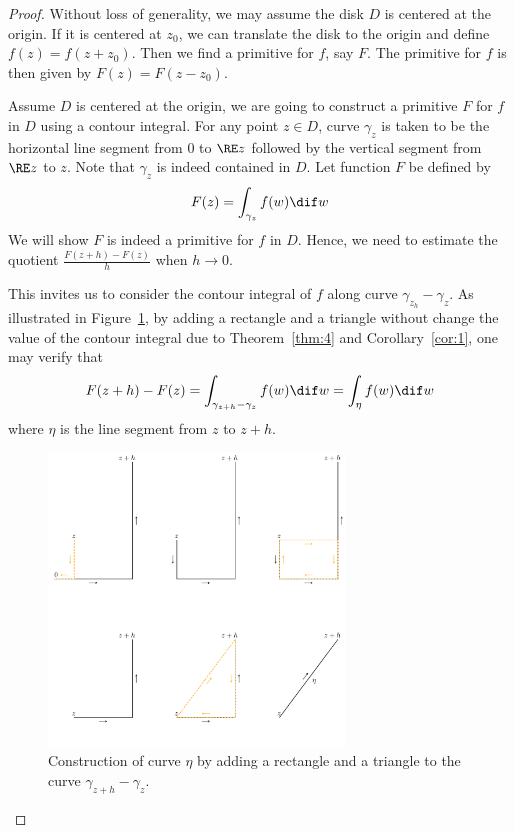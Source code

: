 \documentclass[thmcnt=section, color=cyan, 12pt]{my-elegantbook}
\begin{document}
\begin{proof}
	Without loss of generality, we may assume the disk $D$ is centered at the origin.
	If it is centered at $z_0$,
	we can translate the disk to the origin and define $f(z) = f(z + z_0)$.
	Then we find a primitive for $f$, say $F$.
	The primitive for $f$ is then given by $F(z) = F(z - z_0)$.

	Assume $D$ is centered at the origin,
	we are going to construct a primitive $F$ for $f$ in $D$
	using a contour integral.
	For any point $z \in D$,
	curve $\gamma_z$ is taken to be the horizontal line segment
	from $0$ to $\RE z$
	followed by the vertical segment from $\RE z$ to $z$.
	Note that $\gamma_z$ is indeed contained in $D$.
	Let function $F$ be defined by
	\begin{align*}
		F(z) = \int_{\gamma_z} f(w) \dif w
	\end{align*}
	We will show $F$ is indeed a primitive for $f$ in $D$.
	Hence, we need to estimate the quotient $\frac{F(z+h) - F(z)}{h}$ when $h \to 0$.

	This invites us to consider the contour integral of $f$ along curve $\gamma_{z_h} - \gamma_z$. As illustrated in Figure~\ref{fig:1},
	by adding a rectangle and a triangle without change the value of the contour integral
	due to Theorem~\ref{thm:4} and Corollary~\ref{cor:1}, one may verify that
	\begin{align}
		F(z+h) - F(z)
		= \int_{\gamma_{z+h} - \gamma_z} f(w) \dif w
		= \int_\eta f(w) \dif w
		\label{eq:6}
	\end{align}
	where $\eta$ is the line segment from $z$ to $z+h$.

	\begin{figure}[H]
		\centering
		\includegraphics[width=0.7\textwidth]{figures/adding-a-rectangle-and-a-triangle.png}
		\caption{Construction of curve $\eta$ by adding a rectangle and a triangle to the curve $\gamma_{z+h} - \gamma_z$.}
		\label{fig:1}
	\end{figure}


\end{proof}
\end{document}
